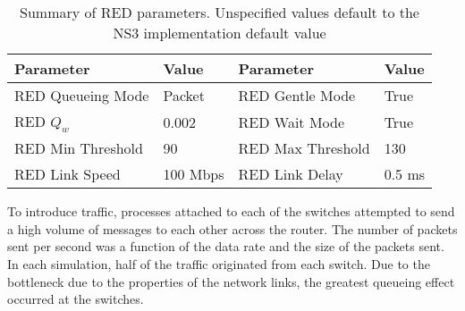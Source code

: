 %

\begin{table}
\begin{center}
\begin{tabular}{ | l | l || l | l | } \hline
Parameter & Value & Parameter & Value        \\ \hline
RED Queueing Mode & Packet & RED Gentle Mode & True    \\ \hline
RED $Q_{w}$ & 0.002 & RED Wait Mode & True      \\ \hline
RED Min Threshold & 90 & RED Max Threshold & 130   \\ \hline
RED Link Speed & 100 Mbps & RED Link Delay & 0.5 ms   \\ \hline
\end{tabular}
\end{center}
\caption{Summary of \ac{RED} parameters. Unspecified values default to the \ac{NS3} implementation default value}
\label{tab:red-parameters}
\end{table}

To introduce traffic, processes attached to each of the switches attempted to send a high volume of messages to each other across the router.
The number of packets sent per second was a function of the data rate and the size of the packets sent.
In each simulation, half of the traffic originated from each switch.
Due to the bottleneck due to the properties of the network links, the greatest queueing effect occurred at the switches.
